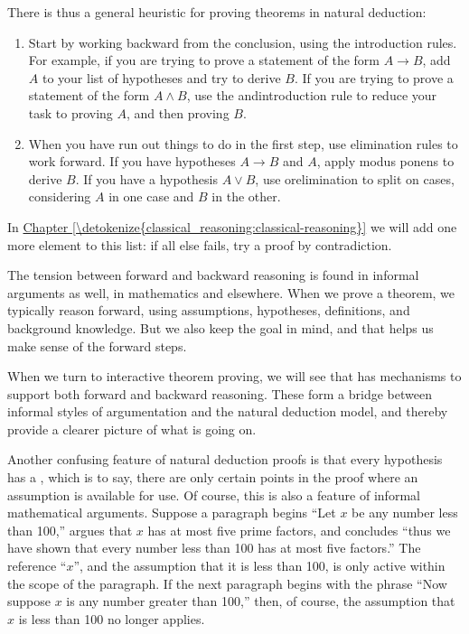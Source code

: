\documentclass[letterpaper,10pt,english]{sphinxmanual}
\begin{document}
\sphinxAtStartPar
There is thus a general heuristic for proving theorems in natural deduction:
\begin{enumerate}
%
\item {} 
\sphinxAtStartPar
Start by working backward from the conclusion, using the introduction rules. For example, if you are trying to prove a statement of the form \(A \to B\), add \(A\) to your list of hypotheses and try to derive \(B\). If you are trying to prove a statement of the form \(A \wedge B\), use the and\sphinxhyphen{}introduction rule to reduce your task to proving \(A\), and then proving \(B\).

\item {} 
\sphinxAtStartPar
When you have run out things to do in the first step, use elimination rules to work forward. If you have hypotheses \(A \to B\) and \(A\), apply modus ponens to derive \(B\). If you have a hypothesis \(A \vee B\), use or\sphinxhyphen{}elimination to split on cases, considering \(A\) in one case and \(B\) in the other.

\end{enumerate}

\sphinxAtStartPar
In \hyperref[\detokenize{classical_reasoning:classical-reasoning}]{Chapter \ref{\detokenize{classical_reasoning:classical-reasoning}}} we will add one more element to this list: if all else fails, try a proof by contradiction.

\sphinxAtStartPar
The tension between forward and backward reasoning is found in informal arguments as well, in mathematics and elsewhere. When we prove a theorem, we typically reason forward, using assumptions, hypotheses, definitions, and background knowledge. But we also keep the goal in mind, and that helps us make sense of the forward steps.

\sphinxAtStartPar
When we turn to interactive theorem proving, we will see that  has mechanisms to support both forward and backward reasoning. These form a bridge between informal styles of argumentation and the natural deduction model, and thereby provide a clearer picture of what is going
on.

\sphinxAtStartPar
Another confusing feature of natural deduction proofs is that every hypothesis has a , which is to say, there are only certain points in the proof where an assumption is available for use. Of course, this is also a feature of informal mathematical arguments. Suppose a paragraph begins “Let \(x\) be any number less than 100,” argues that \(x\) has at most five prime factors, and concludes “thus we have shown that every number less than 100 has at most five factors.” The reference “\(x\)”, and the assumption that it is less than 100, is only active within the scope of the paragraph. If the next paragraph begins with the phrase “Now suppose \(x\) is any number greater than 100,” then, of course, the assumption that \(x\) is less than 100 no longer applies.
\end{document}
